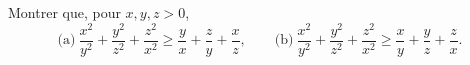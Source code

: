 Montrer que, pour $x, y, z > 0$,
\[ \text{(a)}\ \frac{x^2}{y^2} + \frac{y^2}{z^2} + \frac{z^2}{x^2} \geq \frac{y}{x} + \frac{z}{y} + \frac{x}{z},\qquad \text{(b)}\ \frac{x^2}{y^2} + \frac{y^2}{z^2} + \frac{z^2}{x^2} \geq \frac{x}{y} + \frac{y}{z} + \frac{z}{x}. \]
